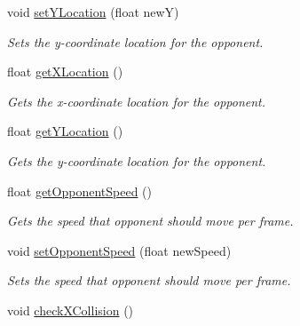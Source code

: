 \begin{DoxyCompactItemize}
void \mbox{\hyperlink{class_opponent_a11e1ae439fff02f56d9de8bfe1e972bb}{set\+Y\+Location}} (float newY)
\begin{DoxyCompactList}\small\item\em Sets the y-\/coordinate location for the opponent. \end{DoxyCompactList}\item 
\mbox{\label{class_opponent_a176105270c8cd55066c292bfc243eaf5}} 
float \mbox{\hyperlink{class_opponent_a176105270c8cd55066c292bfc243eaf5}{get\+X\+Location}} ()
\begin{DoxyCompactList}\small\item\em Gets the x-\/coordinate location for the opponent. \end{DoxyCompactList}\item 
\mbox{\label{class_opponent_a8296b6e6eb187b2215cc12be5a2a9dc4}} 
float \mbox{\hyperlink{class_opponent_a8296b6e6eb187b2215cc12be5a2a9dc4}{get\+Y\+Location}} ()
\begin{DoxyCompactList}\small\item\em Gets the y-\/coordinate location for the opponent. \end{DoxyCompactList}\item 
\mbox{\label{class_opponent_a1e7ef1dff046396445b8a04842493136}} 
float \mbox{\hyperlink{class_opponent_a1e7ef1dff046396445b8a04842493136}{get\+Opponent\+Speed}} ()
\begin{DoxyCompactList}\small\item\em Gets the speed that opponent should move per frame. \end{DoxyCompactList}\item 
\mbox{\label{class_opponent_a6b828d4aca39ce5a4866fba69448c4be}} 
void \mbox{\hyperlink{class_opponent_a6b828d4aca39ce5a4866fba69448c4be}{set\+Opponent\+Speed}} (float new\+Speed)
\begin{DoxyCompactList}\small\item\em Sets the speed that opponent should move per frame. \end{DoxyCompactList}\item 
\mbox{\label{class_opponent_a2783d2937ffd00118285262932bf79ef}} 
void \mbox{\hyperlink{class_opponent_a2783d2937ffd00118285262932bf79ef}{check\+X\+Collision}} ()

\end{DoxyCompactItemize}
